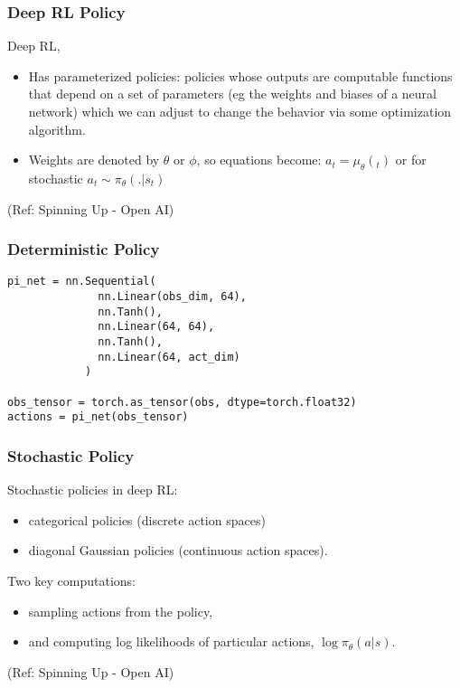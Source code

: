 \begin{frame}[fragile]\frametitle{Deep RL Policy}

Deep RL, 
\begin{itemize}

\item Has parameterized policies: policies whose outputs are computable functions that depend on a set of parameters (eg the weights and biases of a neural network) which we can adjust to change the behavior via some optimization algorithm.
\item Weights are denoted by $\theta$ or $\phi$, so equations become: $a_t=\mu_\theta(_t)$ or for stochastic $a_t \sim \pi_\theta(.|s_t)$
\end{itemize}

{\tiny (Ref: Spinning Up - Open AI)}


\end{frame}

\begin{frame}[fragile]\frametitle{Deterministic Policy}

\begin{lstlisting}
pi_net = nn.Sequential(
              nn.Linear(obs_dim, 64),
              nn.Tanh(),
              nn.Linear(64, 64),
              nn.Tanh(),
              nn.Linear(64, act_dim)
            )
						
obs_tensor = torch.as_tensor(obs, dtype=torch.float32)
actions = pi_net(obs_tensor)
\end{lstlisting}

\end{frame}

\begin{frame}[fragile]\frametitle{Stochastic  Policy}

Stochastic policies in deep RL: 
\begin{itemize}
\item categorical policies (discrete action spaces) 
\item diagonal Gaussian policies (continuous action spaces).
\end{itemize}

Two key computations:
\begin{itemize}
\item sampling actions from the policy,
\item and computing log likelihoods of particular actions, $\log \pi_{\theta}(a|s)$.
\end{itemize}

{\tiny (Ref: Spinning Up - Open AI)}
\end{frame}

